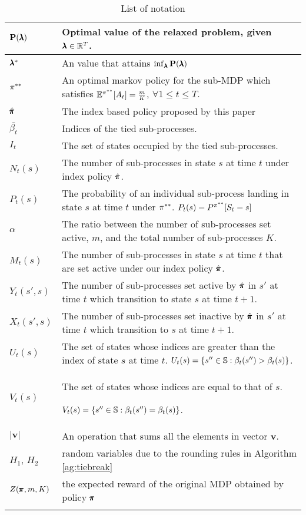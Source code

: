 \begin{centering}
\begin{longtable}{| p{} | p{} |}
\hline
$\mathbf{P}(\pmb{\lambda})$& Optimal value of the relaxed problem, given $\pmb{\lambda}\in\mathbb{R}^{T}$.\\ 
\hline
$\pmb{\lambda}^*$& An value that attains $\inf_{\pmb{\lambda}}\mathbf{P}(\pmb{\lambda})$\\ 
\hline
$\pi^{**}$& An optimal markov policy for the sub-MDP which satisfies $\mathbb{E}^{\pi^{**}}[A_t]=\frac{m}{K}$, $\forall 1\leq t\leq T $.\\ 
\hline
$\hat{\pmb{\pi}}$& The index based policy proposed by this paper\\ 
\hline
$\bar{\beta_t}$& Indices of the tied sub-processes.\\ 
\hline
$I_t$& The set of states occupied by the tied sub-processes.\\ 
\hline
$N_t(s)$& The number of sub-processes in state $s$ at time $t$ under index policy $\hat{\pmb{\pi}}$.\\ 
\hline
$P_t(s)$& The probability of an individual sub-process landing in state $s$ at time $t$ under $\pi^{**}$. $P_t(s)=P^{\pi^{**}}[S_t=s]$\\ 
\hline
$\alpha$& The ratio between the number of sub-processes set active, $m$, and the total number of sub-processes $K$.\\ 
\hline
$M_t(s)$& The number of sub-processes in state $s$ at time $t$ that are set active under our index policy $\hat{\pmb{\pi}}$.\\ 
\hline
$Y_t(s',s)$ & The number of sub-processes set active by $\hat{\pmb{\pi}}$ in $s'$ at time $t$ which transition to state $s$ at time $t+1$. \\
\hline
$X_t(s',s)$ & The number of sub-processes set inactive by $\hat{\pmb{\pi}}$ in $s'$ at time $t$ which transition to $s$ at time $t+1$.\\
\hline
$U_t(s)$ & The set of states whose indices are greater than the index of state $s$ at time $t$. $U_t(s) = \{s''\in \mathbb{S}:\beta_{t}(s'')>\beta_{t}(s)\}$. \\
\hline
$V_t(s)$ & The set of states whose indices are equal to that of $s$.

 $V_t(s) = \{s''\in\mathbb{S}:\beta_t(s'')=\beta_t(s)\}$.\\
\hline
$|\mathbf{v}|$ &  An operation that sums all the elements in vector $\mathbf{v}$.  \\
\hline
$H_1$, $H_2$ & random variables due to the rounding rules in Algorithm \ref{ag:tiebreak}\\
\hline
$Z(\pmb{\pi},m,K)$ & the expected reward of the original MDP obtained by policy $\pmb{\pi}$\\
\hline
\caption{List of notation}
\label{notations}
\end{longtable}
\end{centering}
